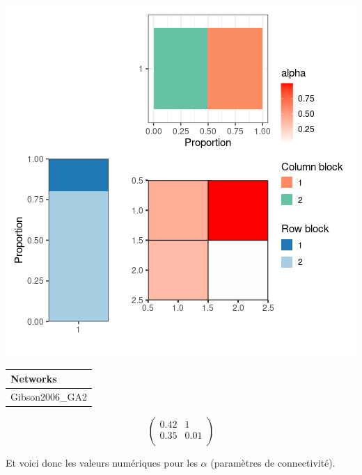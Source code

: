 \includegraphics{./img/be03e1e125628e702f825f4e55f2a3d50d226045.png}\newline \tiny

\begin{tabular}{l}
\toprule
Networks\\
\midrule
Gibson2006\_GA2\\
\bottomrule
\end{tabular}

\normalsize\newline\[\begin{pmatrix} 0.42 &1 \\0.35 &0.01 \\ \end{pmatrix}\]

Et voici donc les valeurs numériques pour les \(\alpha\) (paramètres de
connectivité).

